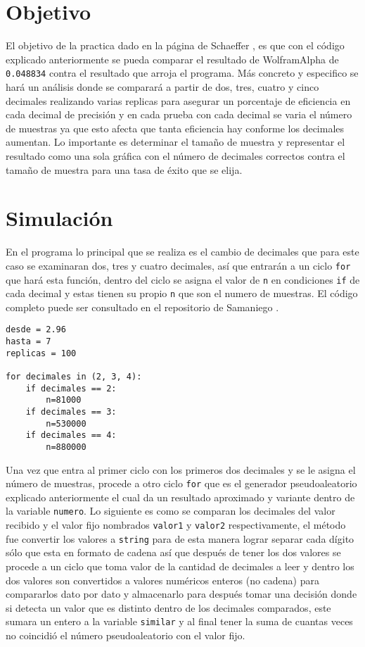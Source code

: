\documentclass[a4paper, 11pt]{article}
\begin{document}
\section{Objetivo}
El objetivo de la practica dado en la página de Schaeffer \cite{elisa}, es que con el código explicado anteriormente se pueda comparar el resultado de WolframAlpha de \texttt{0.048834} contra el resultado que arroja el programa. 
Más concreto y especifico se hará un análisis donde se comparará a partir de dos, tres, cuatro y cinco decimales realizando varias replicas para asegurar un porcentaje de eficiencia en cada decimal de precisión y en cada prueba con cada decimal se varia el número de muestras ya que esto afecta que tanta eficiencia hay conforme los decimales aumentan.
Lo importante es determinar el tamaño de muestra y representar el resultado como una sola gráfica con el número de decimales correctos contra el tamaño de muestra para una tasa de éxito que se elija.

\section{Simulación}
En el programa lo principal que se realiza es el cambio de decimales que para este caso se examinaran dos, tres y cuatro decimales, así que entrarán a un ciclo \texttt{for} que hará esta función, dentro del ciclo se asigna el valor de \texttt{n} en condiciones \texttt{if} de cada decimal y estas tienen su propio \texttt{n} que son el numero de muestras. El código completo puede ser consultado en el repositorio de Samaniego \cite{Edson}.
\bigskip
\begin{verbatim}
desde = 2.96
hasta = 7
replicas = 100

for decimales in (2, 3, 4):
    if decimales == 2:
        n=81000
    if decimales == 3:
        n=530000
    if decimales == 4:
        n=880000    
\end{verbatim}
\bigskip

Una vez que entra al primer ciclo con los primeros dos decimales y se le asigna el número de muestras, procede a otro ciclo \texttt{for} que es el generador pseudoaleatorio explicado anteriormente el cual da un resultado aproximado y variante dentro de la variable \texttt{numero}. Lo siguiente es como se comparan los decimales del valor recibido y el valor fijo nombrados \texttt{valor1} y \texttt{valor2} respectivamente, el método fue convertir los valores a \texttt{string} para de esta manera lograr separar cada dígito sólo que esta en formato de cadena así que después de tener los dos valores se procede a un ciclo que toma valor de la cantidad de decimales a leer y dentro los dos valores son convertidos a valores numéricos enteros (no cadena) para compararlos dato por dato y almacenarlo para después tomar una decisión donde si detecta un valor que es distinto dentro de los decimales comparados, este sumara un entero a la variable \texttt{similar} y al final tener la suma de cuantas veces no coincidió el número pseudoaleatorio con el valor fijo.
\end{document}
